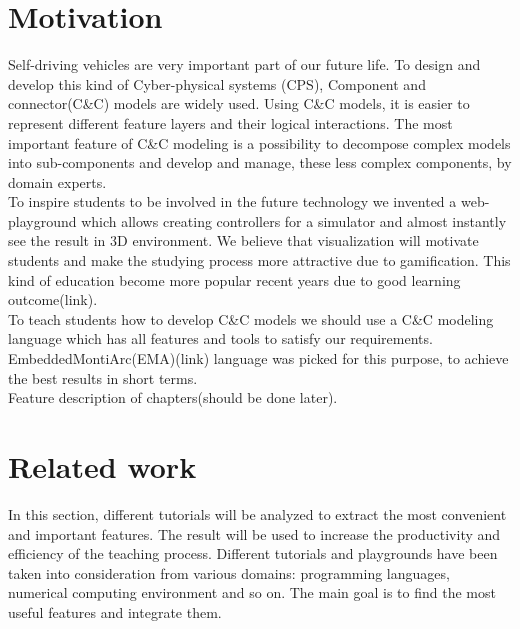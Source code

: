 \setlength{\parindent}{3ex}
\setlength{\parskip}{0ex}

\chapter{Motivation}
Self-driving vehicles are very important part of our future life. To design and develop this kind of Cyber-physical systems (CPS), Component and connector(C\&C) models are widely used. Using C\&C models, it is easier to represent different feature layers and their logical interactions. The most important feature of C\&C modeling is a possibility to decompose complex models into sub-components and develop and manage, these less complex components, by domain experts.\\
To inspire students to be involved in the future technology we invented a web-playground which allows creating controllers for a simulator and almost instantly see the result in 3D environment. We believe that visualization will motivate students and make the studying process more attractive due to gamification. This kind of education become more popular recent years due to good learning outcome(link).\\
To teach students how to develop C\&C models we should use a C\&C modeling language which has all features and tools to satisfy our requirements. EmbeddedMontiArc(EMA)(link) language was picked for this purpose, to achieve the best results in short terms.\\

Feature description of chapters(should be done later).

\cleardoublepage

\chapter{Related work}
In this section, different tutorials will be analyzed to extract the most convenient and important features. The result will be used to increase the productivity and efficiency of the teaching process. Different tutorials and playgrounds have been taken into consideration from various domains: programming languages, numerical computing environment and so on. The main goal is to find the most useful features and integrate them.

